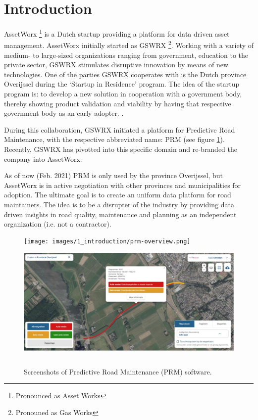 \clearpage
\section{Introduction}

AssetWorx \footnote{Pronounced as Asset Works} is a Dutch startup providing a platform for data driven asset management. AssetWorx initially started as GSWRX \footnote{Pronouned as Gas Works}. Working with a variety of medium- to large-sized organizations ranging from government, education to the private sector, GSWRX stimulates disruptive innovation by means of new technologies. One of the parties GSWRX cooperates with is the Dutch province Overijssel during the ‘Startup in Residence’ program. The idea of the startup program is: to develop a new solution in cooperation with a government body, thereby showing product validation and viability by having that respective government body as an early adopter. \cite{Residense2020}.

During this collaboration, GSWRX initiated a platform for Predictive Road Maintenance, with the respective abbreviated name: PRM (see figure \ref{fig:prm}). Recently, GSWRX has pivotted into this specific domain and re-branded the company into AssetWorx.

As of now (Feb. 2021) PRM is only used by the province Overijssel, but AssetWorx is in active negotiation with other provinces and municipalities for adoption. The ultimate goal is to create an uniform data platform for road maintainers. The idea is to be a disrupter of the industry by providing data driven insights in road quality, maintenance and planning as an independent organization (i.e. not a contractor). 

\begin{figure}[ht]
    \begin{center}
    \texttt{[image: images/1\_introduction/prm-overview.png]}
    \includegraphics[height=6cm]{images/1_introduction/prm-detail.png}
    \end{center}
    \caption{Screenshots of Predictive Road Maintenance (PRM) software.}
    \label{fig:prm}
\end{figure}

